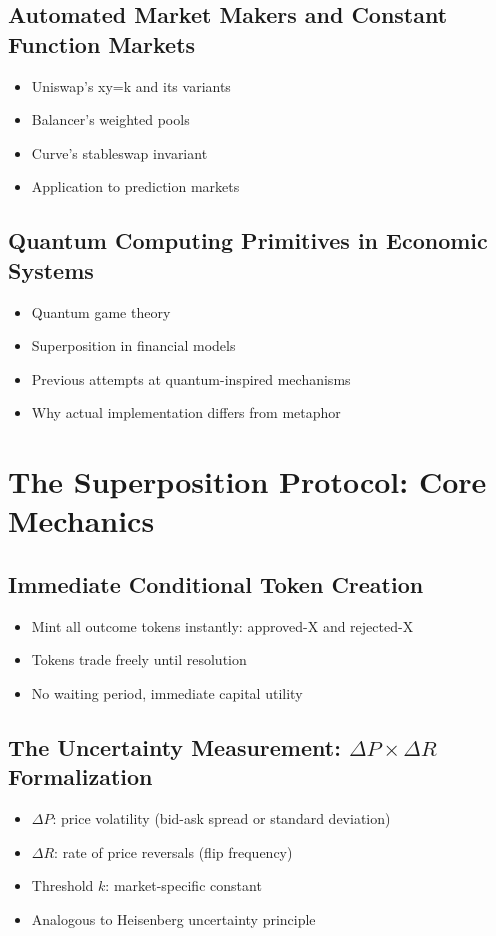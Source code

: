 \documentclass{article}
\begin{document}
\subsection{Automated Market Makers and Constant Function Markets}
\begin{itemize}
    \item Uniswap's xy=k and its variants
    \item Balancer's weighted pools
    \item Curve's stableswap invariant
    \item Application to prediction markets
\end{itemize}

\subsection{Quantum Computing Primitives in Economic Systems}
\begin{itemize}
    \item Quantum game theory
    \item Superposition in financial models
    \item Previous attempts at quantum-inspired mechanisms
    \item Why actual implementation differs from metaphor
\end{itemize}

\section{The Superposition Protocol: Core Mechanics}
\subsection{Immediate Conditional Token Creation}
\begin{itemize}
   \item Mint all outcome tokens instantly: approved-X and rejected-X
   \item Tokens trade freely until resolution
   \item No waiting period, immediate capital utility
\end{itemize}

\subsection{The Uncertainty Measurement: $\Delta P \times \Delta R$ Formalization}
\begin{itemize}
   \item $\Delta P$: price volatility (bid-ask spread or standard deviation)
   \item $\Delta R$: rate of price reversals (flip frequency)
   \item Threshold $k$: market-specific constant
   \item Analogous to Heisenberg uncertainty principle
\end{itemize}
\end{document}
